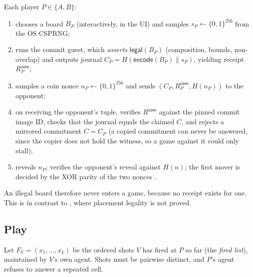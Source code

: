 \documentclass[11pt,a4paper]{article}
\newcommand{\C}{\ensuremath{C}}
\begin{document}
Each player $P \in \{A, B\}$:
\begin{enumerate}[noitemsep,topsep=2pt]
\item chooses a board $B_P$ (interactively, in the UI) and samples
      $s_P \leftarrow \{0,1\}^{256}$ from the OS CSPRNG;
\item runs the \textsf{commit} guest, which \emph{asserts}
      $\mathsf{legal}(B_P)$ (composition, bounds, non-overlap) and outputs
      journal $\C_P = H(\mathsf{encode}(B_P)\|s_P)$, yielding receipt
      $R^{\mathsf{com}}_P$;
\item samples a coin nonce $n_P \leftarrow \{0,1\}^{256}$ and sends
      $(\C_P, R^{\mathsf{com}}_P, H(n_P))$ to the opponent;
\item on receiving the opponent's tuple, verifies $R^{\mathsf{com}}$ against
      the pinned \textsf{commit} image ID, checks that the journal equals the
      claimed $\C$, and rejects a mirrored commitment $\C = \C_P$ (a copied
      commitment can never be answered, since the copier does not hold the
      witness, so a game against it could only stall);
\item reveals $n_P$; verifies the opponent's reveal against $H(n)$;
      the first mover is decided by the XOR parity of the two nonces
      \cite{blum}.
\end{enumerate}

An illegal board therefore never enters a game, because no receipt exists for
one. This is in contrast to \cite{mit6857}, where placement legality is not
proved.

\subsection{Play}

Let $F_V = (x_1, \dots, x_k)$ be the ordered shots $V$ has fired at $P$ so
far (the \emph{fired list}), maintained by $V$'s own agent. Shots must be
pairwise distinct, and $P$'s agent refuses to answer a repeated cell.
\end{document}
